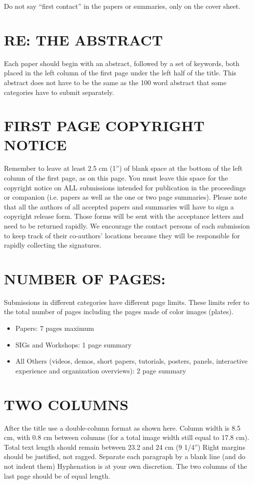 Do not say ``first contact'' in the papers or summaries, only on the cover sheet.

\section{RE: THE ABSTRACT}
Each paper should begin with an abstract, followed by a set of 
keywords, both placed in the left column of the first page under the 
left half of the title. This abstract does not have to be the same as 
the 100 word abstract that some categories have to submit separately. 

\section{FIRST PAGE COPYRIGHT NOTICE}
Remember to leave at least 2.5 cm (1'') of blank space at the bottom  
of  the  left column  of  the first  page,  as  on this page. You must 
leave this space for the copyright notice on ALL submissions intended 
for publication in the proceedings or companion (i.e. papers as well 
as the one or two page summaries).  Please note that all the authors 
of all accepted papers and summaries will have to sign a copyright 
release form.  Those forms will be sent with the acceptance letters 
and need to be returned rapidly.  We encourage the contact persons of 
each submission to keep track of their co-authors' locations because 
they will be responsible for rapidly collecting the signatures.

\section{NUMBER OF PAGES:}
Submissions in different categories have different 
page limits. These limits refer to the total number of pages including 
the pages made of color images (plates).


\begin{itemize}
\item Papers: 7 pages maximum
\item SIGs and Workshops: 1 page summary
\item All Others (videos, demos, 
short papers, tutorials, posters, panels, interactive experience and 
organization overviews):  2 page summary
\end{itemize}

\section{TWO COLUMNS}
After the title use a double-column format as shown 
here. Column width is 8.5 cm, with 0.8 cm between columns (for a total 
image width still equal to 17.8 cm).  Total text length should remain 
between 23.2 and 24 cm (9 1/4'') Right margins should be justified, 
not ragged.   Separate each paragraph by a blank line (and do not 
indent them)  Hyphenation is at your own discretion.  The two columns 
of the last page should be of equal length. 


